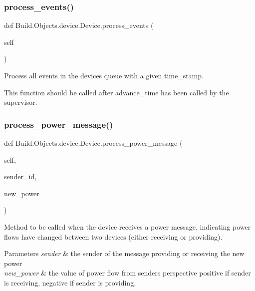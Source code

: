 \subsubsection{\texorpdfstring{process\+\_\+events()}{process\_events()}}
{\footnotesize\ttfamily def Build.\+Objects.\+device.\+Device.\+process\+\_\+events (\begin{DoxyParamCaption}\item[{}]{self }\end{DoxyParamCaption})}



Process all events in the device\textquotesingle{}s queue with a given time\+\_\+stamp. 

This function should be called after advance\+\_\+time has been called by the supervisor. \mbox{\label{class_build_1_1_objects_1_1device_1_1_device_af90a8b21aab7e60dc6ca1dcd7fe00b6f}} 
\subsubsection{\texorpdfstring{process\+\_\+power\+\_\+message()}{process\_power\_message()}}
{\footnotesize\ttfamily def Build.\+Objects.\+device.\+Device.\+process\+\_\+power\+\_\+message (\begin{DoxyParamCaption}\item[{}]{self,  }\item[{}]{sender\+\_\+id,  }\item[{}]{new\+\_\+power }\end{DoxyParamCaption})}



Method to be called when the device receives a power message, indicating power flows have changed between two devices (either receiving or providing). 


\begin{DoxyParams}{Parameters}
{\em sender} & the sender of the message providing or receiving the new power \\
\hline
{\em new\+\_\+power} & the value of power flow from sender\textquotesingle{}s perspective positive if sender is receiving, negative if sender is providing. \\
\hline
\end{DoxyParams}
\mbox{\label{class_build_1_1_objects_1_1device_1_1_device_ab4a83ea60755c15f89dcbff7a10f55cc}} 
